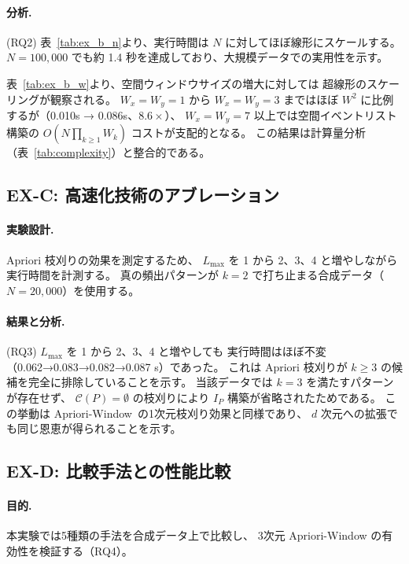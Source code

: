 \paragraph{分析.}
(RQ2) 表~\ref{tab:ex_b_n}より、実行時間は $N$ に対してほぼ線形にスケールする。
$N = 100{,}000$ でも約 1.4 秒を達成しており、大規模データでの実用性を示す。

表~\ref{tab:ex_b_w}より、空間ウィンドウサイズの増大に対しては
超線形のスケーリングが観察される。
$W_x = W_y = 1$ から $W_x = W_y = 3$ まではほぼ $W^2$ に比例するが（0.010s → 0.086s、$8.6\times$）、
$W_x = W_y = 7$ 以上では空間イベントリスト構築の $O(N \prod_{k \geq 1} W_k)$ コストが支配的となる。
この結果は計算量分析（表~\ref{tab:complexity}）と整合的である。

\subsection{EX-C: 高速化技術のアブレーション}\label{sec:ex_c}

\paragraph{実験設計.}
Apriori 枝刈りの効果を測定するため、
$L_{\max}$ を 1 から 2、3、4 と増やしながら実行時間を計測する。
真の頻出パターンが $k=2$ で打ち止まる合成データ（$N = 20{,}000$）を使用する。

\paragraph{結果と分析.}
(RQ3) $L_{\max}$ を 1 から 2、3、4 と増やしても
実行時間はほぼ不変（0.062→0.083→0.082→0.087 s）であった。
これは Apriori 枝刈りが $k \geq 3$ の候補を完全に排除していることを示す。
当該データでは $k = 3$ を満たすパターンが存在せず、
$\mathcal{C}(P) = \emptyset$ の枝刈りにより $I_P$ 構築が省略されたためである。
この挙動は Apriori-Window~\cite{aprioriwindow}の1次元枝刈り効果と同様であり、
$d$ 次元への拡張でも同じ恩恵が得られることを示す。

\subsection{EX-D: 比較手法との性能比較}
\label{sec:ex_d}

\paragraph{目的.}
本実験では5種類の手法を合成データ上で比較し、
3次元 Apriori-Window の有効性を検証する（RQ4）。

